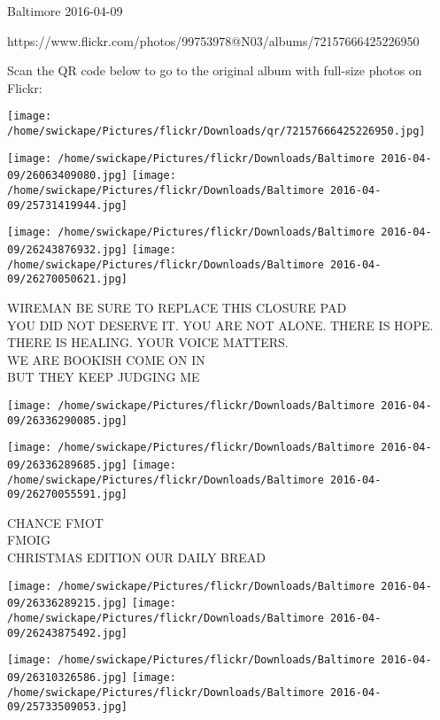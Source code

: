\documentclass[10pt,letterpaper]{article}
\begin{document}
Baltimore 2016-04-09

https://www.flickr.com/photos/99753978@N03/albums/72157666425226950

Scan the QR code below to go to the original album with full-size photos on Flickr:

\texttt{[image: /home/swickape/Pictures/flickr/Downloads/qr/72157666425226950.jpg]}
\pagebreak

\texttt{[image: /home/swickape/Pictures/flickr/Downloads/Baltimore 2016-04-09/26063409080.jpg]}
\texttt{[image: /home/swickape/Pictures/flickr/Downloads/Baltimore 2016-04-09/25731419944.jpg]}

\texttt{[image: /home/swickape/Pictures/flickr/Downloads/Baltimore 2016-04-09/26243876932.jpg]}
\texttt{[image: /home/swickape/Pictures/flickr/Downloads/Baltimore 2016-04-09/26270050621.jpg]}

WIREMAN BE SURE TO REPLACE THIS CLOSURE PAD\\
YOU DID NOT DESERVE IT. YOU ARE NOT ALONE. THERE IS HOPE. THERE IS HEALING. YOUR VOICE MATTERS.\\
WE ARE BOOKISH COME ON IN\\
BUT THEY KEEP JUDGING ME\\
\pagebreak

\texttt{[image: /home/swickape/Pictures/flickr/Downloads/Baltimore 2016-04-09/26336290085.jpg]}

\vspace{0.25in}
\texttt{[image: /home/swickape/Pictures/flickr/Downloads/Baltimore 2016-04-09/26336289685.jpg]}
\texttt{[image: /home/swickape/Pictures/flickr/Downloads/Baltimore 2016-04-09/26270055591.jpg]}

CHANCE FMOT\\
FMOIG\\
CHRISTMAS EDITION OUR DAILY BREAD\\
\pagebreak

\texttt{[image: /home/swickape/Pictures/flickr/Downloads/Baltimore 2016-04-09/26336289215.jpg]}
\texttt{[image: /home/swickape/Pictures/flickr/Downloads/Baltimore 2016-04-09/26243875492.jpg]}

\texttt{[image: /home/swickape/Pictures/flickr/Downloads/Baltimore 2016-04-09/26310326586.jpg]}
\texttt{[image: /home/swickape/Pictures/flickr/Downloads/Baltimore 2016-04-09/25733509053.jpg]}
\end{document}
